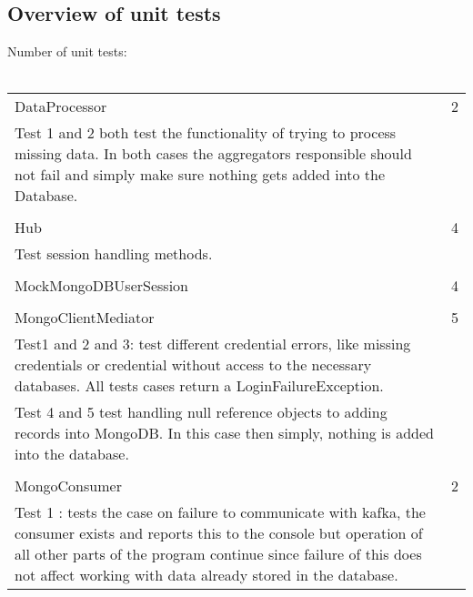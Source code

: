 \documentclass[oneside, english, final]{design}
\begin{document}
\subsection{Overview of unit tests}
Number of unit tests:\\
\hfill
\\
\begin{tabular}{|p{}p{}}
      DataProcessor             & 2                                                                                                                                                \\  Test 1 and 2 both test the functionality of trying to process missing data. In both cases the aggregators responsible should not fail and simply make sure nothing gets added into the Database.\\ \\
      Hub                       & 4                                                                                                                                                \\ Test session handling methods.\\ \\
      MockMongoDBUserSession    & 4                                                                                                                                                \\ \\
      MongoClientMediator       & 5                                                                                                                                                \\ Test1 and 2 and 3: test different credential errors, like missing credentials or credential without access to the necessary databases. All tests cases return a LoginFailureException.\\
      Test 4 and 5 test handling null reference objects to adding records into MongoDB. In this case then simply, nothing is added into the database.                              \\ \\
      MongoConsumer             & 2                                                                                                                                                \\ Test 1 : tests the case on failure to communicate with kafka, the consumer exists and reports this to the console but operation of all other parts of the program continue since failure of this does not affect working with data already stored in the database.\\

\end{tabular}
\end{document}

